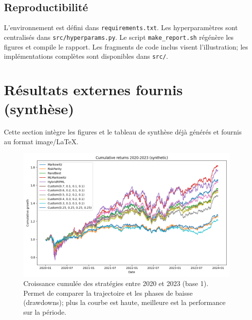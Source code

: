 \documentclass[11pt,a4paper]{article}
\begin{document}
\subsection*{Reproductibilité}
L'environnement est défini dans \texttt{requirements.txt}. Les hyperparamètres sont centralisés dans \texttt{src/hyperparams.py}. Le script \texttt{make\_report.sh} régénère les figures et compile le rapport. Les fragments de code inclus visent l'illustration; les implémentations complètes sont disponibles dans \texttt{src/}.

\section*{Résultats externes fournis (synthèse)}
Cette section intègre les figures et le tableau de synthèse déjà générés et fournis au format image/\LaTeX{}.

\begin{figure}[h]
  \centering
  \includegraphics[width=0.9\linewidth]{../../figures/cumulative_portfolios_generated.png}
  \caption{Croissance cumulée des stratégies entre 2020 et 2023 (base 1). Permet de comparer la trajectoire et les phases de baisse (drawdowns); plus la courbe est haute, meilleure est la performance sur la période.}
  \label{fig:cum_external}
\end{figure}
\end{document}
